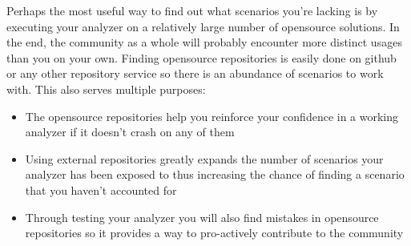 Perhaps the most useful way to find out what scenarios you're lacking is by executing your analyzer on a relatively large number of \gls{opensource} \glspl{solution}. In the end, the community as a whole will probably encounter more distinct usages than you on your own. Finding \gls{opensource} repositories is easily done on github or any other repository service so there is an abundance of scenarios to work with. This also serves multiple purposes:

\begin{itemize}
\item The \gls{opensource} repositories help you reinforce your confidence in a working analyzer if it doesn't crash on any of them
\item Using external repositories greatly expands the number of scenarios your analyzer has been exposed to thus increasing the chance of finding a scenario that you haven't accounted for
\item Through testing your analyzer you will also find mistakes in \gls{opensource} repositories so it provides a way to pro-actively contribute to the community
\end{itemize}